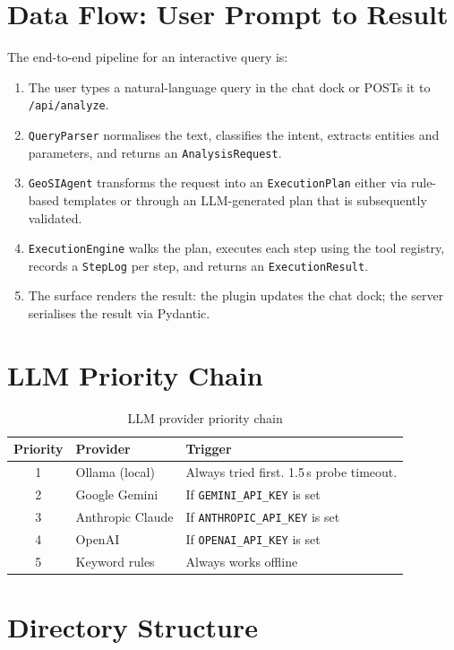 \documentclass[12pt,a4paper]{report}
\begin{document}
\section{Data Flow: User Prompt to Result}

The end-to-end pipeline for an interactive query is:

\begin{enumerate}
  \item The user types a natural-language query in the chat dock or POSTs it to \texttt{/api/analyze}.
  \item \texttt{QueryParser} normalises the text, classifies the intent, extracts entities and parameters, and returns an \texttt{AnalysisRequest}.
  \item \texttt{GeoSIAgent} transforms the request into an \texttt{ExecutionPlan} either via rule-based templates or through an LLM-generated plan that is subsequently validated.
  \item \texttt{ExecutionEngine} walks the plan, executes each step using the tool registry, records a \texttt{StepLog} per step, and returns an \texttt{ExecutionResult}.
  \item The surface renders the result: the plugin updates the chat dock; the server serialises the result via Pydantic.
\end{enumerate}

\section{LLM Priority Chain}

\begin{table}[ht]
\centering
\caption{LLM provider priority chain}
\begin{tabular}{cll}
\toprule
\textbf{Priority} & \textbf{Provider} & \textbf{Trigger} \\
\midrule
1 & Ollama (local)    & Always tried first. 1.5\,s probe timeout. \\
2 & Google Gemini     & If \texttt{GEMINI\_API\_KEY} is set \\
3 & Anthropic Claude  & If \texttt{ANTHROPIC\_API\_KEY} is set \\
4 & OpenAI            & If \texttt{OPENAI\_API\_KEY} is set \\
5 & Keyword rules     & Always works offline \\
\bottomrule
\end{tabular}
\end{table}

\section{Directory Structure}
\end{document}
